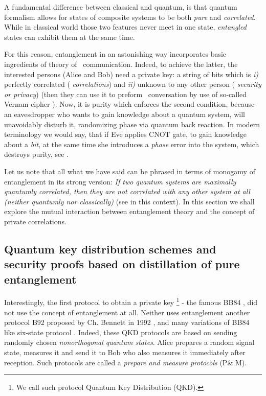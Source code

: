\documentclass[twocolumn,aps,rmp]{revtex4}
\begin{document}
A fundamental difference between classical and quantum, is that
quantum formalism allows for states of composite systems to be both
{\it pure} and {\it correlated}. While in classical world those two
features never meet in one state, {\it entangled} states can exhibit
them at the same time.

For this reason, entanglement in an astonishing way incorporates basic
ingredients of theory of \secure\ communication. Indeed, to achieve
the latter, the interested persons (Alice and Bob) need a private key:
a string of bits which is {\it i)} perfectly correlated ({\it
  correlations}) and {\it ii)} unknown to any other person ({\it
  security or privacy}) (then they can use it to preform \private\
conversation by use of so-called Vernam cipher \cite{Vernam} ). Now, it is purity
which enforces the second condition, because an eavesdropper who wants
to gain knowledge about a quantum system, will unavoidably disturb it,
randomizing phase via quantum back reaction. In modern terminology we
would say, that if Eve applies CNOT gate, to gain knowledge about a
{\it bit}, at the same time she introduces a {\it phase} error into
the system, which destroys purity, see \cite{Zurek81}.

Let us note that all what we have said can be phrased in terms of
monogamy of entanglement in its strong version: {\it If two quantum
  systems are maximally quantumly correlated, then they are not
  correlated with any other system at all (neither quantumly nor
  classically)} (see \cite{KoashiW-monogamy} in this context). In this
section we shall explore the mutual interaction between entanglement
theory and the concept of private correlations.



\subsection{Quantum key distribution schemes and security proofs
based on distillation of pure entanglement}
\label{subsec:Pure_proofs}

Interestingly, the first protocol to obtain a private key \footnote{We
  call such protocol Quantum Key Distribution (QKD).} - the famous
BB84 \cite{BB84}, did not use the concept of entanglement at
all. Neither uses entanglement another protocol B92 proposed by
Ch. Bennett in 1992 \cite{B92}, and many variations of BB84 like
six-state protocol \cite{Bruss6state}. Indeed, these QKD protocols are
based on sending randomly chosen {\it nonorthogonal quantum
  states}. Alice prepares a random signal state, measures it and send
it to Bob who also measures it immediately after reception.  Such
protocols are called a {\it prepare and measure protocols} (P\& M).
\end{document}
